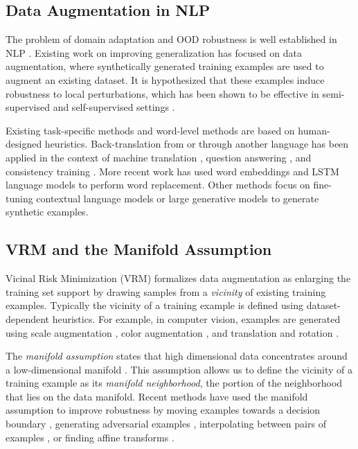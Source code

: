 \subsection{Data Augmentation in NLP}
The problem of domain adaptation and OOD robustness is well established in NLP \citep{blitzer-etal-2007-biographies,daume-iii-2007-frustratingly,hendrycks2020pretrained}.
Existing work on improving generalization has focused on data augmentation, where synthetically generated training examples are used to augment an existing dataset.
It is hypothesized that these examples induce robustness to local perturbations, which has been shown to be effective in semi-supervised and self-supervised settings \citep{bachman2014learning,szegedy2014intriguing, sajjadi2016regularization}.

Existing task-specific methods \citep{kafle-etal-2017-data} and word-level methods \citep{zhang2015character, xie2017data, wei-zou-2019-eda} are based on human-designed heuristics.
Back-translation from or through another language has been applied in the context of machine translation \citep{sennrich2016improving}, question answering \citep{wei2018fast}, and consistency training \citep{xie2019unsupervised}.
More recent work has used word embeddings \citep{wangyang2015thats} and LSTM language models \citep{fadaee2017data} to perform word replacement.
Other methods focus on fine-tuning contextual language models \citep{kobayashi-2018-contextual,wu2019conditional,kumar20202data} or large generative models \citep{lambada,yang2020g-daug,kumar20202data} to generate synthetic examples.

\subsection{VRM and the Manifold Assumption}
Vicinal Risk Minimization (VRM) \citep{vicinal200olivier} formalizes data augmentation as enlarging the training set support by drawing samples from a \textit{vicinity} of existing training examples.
Typically the vicinity of a training example is defined using dataset-dependent heuristics.
For example, in computer vision, examples are generated using scale augmentation \citep{simonyan2014very}, color augmentation \citep{krizhevsky2012imagenet}, and translation and rotation \citep{Simard1998}.

The \textit{manifold assumption} states that high dimensional data concentrates around a low-dimensional manifold \citep{chapelle2006semi}.
This assumption allows us to define the vicinity of a training example as its \textit{manifold neighborhood}, the portion of the neighborhood that lies on the data manifold.
Recent methods have used the manifold assumption to improve robustness by moving examples towards a decision boundary \citep{kanbak2018geometric}, generating adversarial examples \cite{szegedy2014intriguing,miyato2017virtual}, interpolating between pairs of examples \citep{zhang2018mixup}, or finding affine transforms \citep{paschali2019data}.

